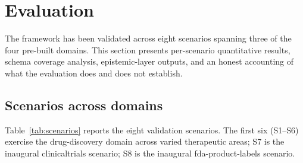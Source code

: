 \section{Evaluation}
\label{sec:evaluation}

The framework has been validated across eight scenarios spanning three of the four pre-built domains. This section presents per-scenario quantitative results, schema coverage analysis, epistemic-layer outputs, and an honest accounting of what the evaluation does and does not establish.

\subsection{Scenarios across domains}

Table~\ref{tab:scenarios} reports the eight validation scenarios. The first six (S1--S6) exercise the drug-discovery domain across varied therapeutic areas; S7 is the inaugural clinicaltrials scenario; S8 is the inaugural fda-product-labels scenario.

